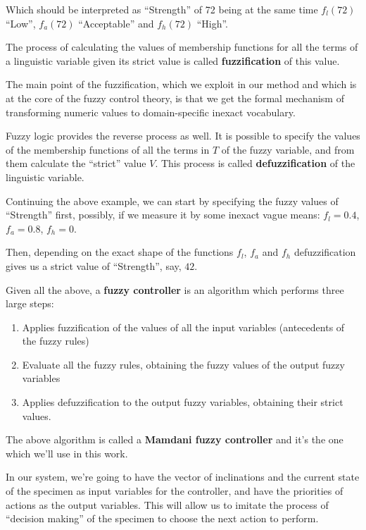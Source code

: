\documentclass[11pt, a4paper]{article}
\begin{document}
  Which should be interpreted as ``Strength'' of 72 being at the same time $f_l(72)$ ``Low'', $f_a(72)$ ``Acceptable'' and $f_h(72)$ ``High''.

  The process of calculating the values of membership functions for all the terms of a linguistic variable given its strict value is called \textbf{fuzzification} of this value.

  The main point of the fuzzification, which we exploit in our method and which is at the core of the fuzzy control theory, is that we get the formal mechanism of transforming numeric values to domain-specific inexact vocabulary.

  Fuzzy logic provides the reverse process as well.
  It is possible to specify the values of the membership functions of all the terms in $T$ of the fuzzy variable, and from them calculate the ``strict'' value $V$.
  This process is called \textbf{defuzzification} of the linguistic variable.

  Continuing the above example, we can start by specifying the fuzzy values of ``Strength'' first, possibly, if we measure it by some inexact vague means:
  $f_l = 0.4$, $f_a = 0.8$, $f_h = 0$.

  Then, depending on the exact shape of the functions $f_l$, $f_a$ and $f_h$ defuzzification gives us a strict value of ``Strength'', say, $42$.

  Given all the above, a \textbf{fuzzy controller} is an algorithm which performs three large steps:

  \begin{enumerate}
    \item Applies fuzzification of the values of all the input variables (antecedents of the fuzzy rules)
    \item Evaluate all the fuzzy rules, obtaining the fuzzy values of the output fuzzy variables
    \item Applies defuzzification to the output fuzzy variables, obtaining their strict values.
  \end{enumerate}

  The above algorithm is called a \textbf{Mamdani fuzzy controller} and it's the one which we'll use in this work.

  In our system, we're going to have the vector of inclinations and the current state of the specimen as input variables for the controller,
  and have the priorities of actions as the output variables.
  This will allow us to imitate the process of ``decision making'' of the specimen to choose the next action to perform.
\end{document}
